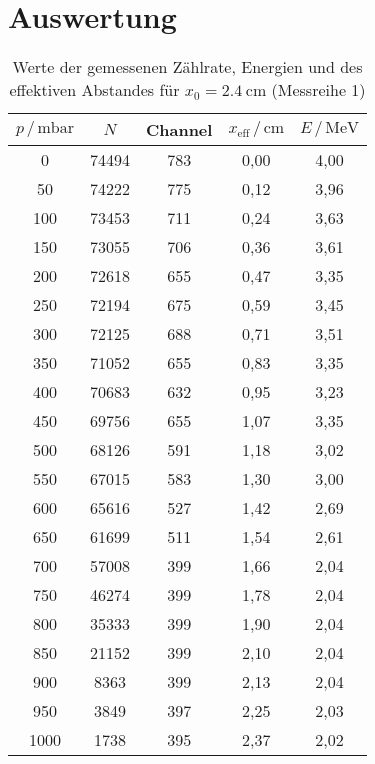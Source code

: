 \section{Auswertung}
\label{sec:Auswertung}


\begin{table}
  \centering
  \caption{Werte der gemessenen Zählrate, Energien und des effektiven Abstandes für 
            $x_0 = \SI{2.4}{\centi\meter}$ (Messreihe 1)}
  \label{tab:mess1}
  \begin{tabular}{c c c c c}
  \toprule
  $p \,/\, \si{\milli\bar}$ & $N$ & Channel & $x_\text{eff} \,/\, \si{\centi\meter}$ & 
  $E \,/\, \si{\mega\eV}$\\
  \midrule 
         0 & 74494 & 783 & 0,00 & 4,00 \\
        50 & 74222 & 775 & 0,12 & 3,96 \\
       100 & 73453 & 711 & 0,24 & 3,63 \\
       150 & 73055 & 706 & 0,36 & 3,61 \\
       200 & 72618 & 655 & 0,47 & 3,35 \\
       250 & 72194 & 675 & 0,59 & 3,45 \\
       300 & 72125 & 688 & 0,71 & 3,51 \\
       350 & 71052 & 655 & 0,83 & 3,35 \\
       400 & 70683 & 632 & 0,95 & 3,23 \\
       450 & 69756 & 655 & 1,07 & 3,35 \\
       500 & 68126 & 591 & 1,18 & 3,02 \\
       550 & 67015 & 583 & 1,30 & 3,00 \\
       600 & 65616 & 527 & 1,42 & 2,69 \\
       650 & 61699 & 511 & 1,54 & 2,61 \\
       700 & 57008 & 399 & 1,66 & 2,04 \\
       750 & 46274 & 399 & 1,78 & 2,04 \\
       800 & 35333 & 399 & 1,90 & 2,04 \\
       850 & 21152 & 399 & 2,10 & 2,04 \\
       900 &  8363 & 399 & 2,13 & 2,04 \\
       950 &  3849 & 397 & 2,25 & 2,03 \\
      1000 &  1738 & 395 & 2,37 & 2,02 \\
  \bottomrule
  \end{tabular}
  \end{table}


